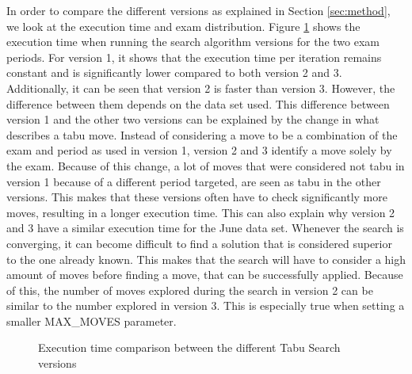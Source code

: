 In order to compare the different versions as explained in Section \ref{sec:method}, we look at the execution time and exam distribution.  Figure \ref{fig:version_comparison} shows the execution time when running the search algorithm versions for the two exam periods. For version 1, it shows that the execution time per iteration remains constant and is significantly lower compared to both version 2 and 3. Additionally, it can be seen that version 2 is faster than version 3. However, the difference between them depends on the data set used. This difference between version 1 and the other two versions can be explained by the change in what describes a tabu move. Instead of considering a move to be a combination of the exam and period as used in version 1, version 2 and 3 identify a move solely by the exam. Because of this change, a lot of moves that were considered not tabu in version 1 because of a different period targeted, are seen as tabu in the other versions. This makes that these versions often have to check significantly more moves, resulting in a longer execution time. This can also explain why version 2 and 3 have a similar execution time for the June data set. Whenever the search is converging, it can become difficult to find a solution that is considered superior to the one already known. This makes that the search will have to consider a high amount of moves before finding a move, that can be successfully applied. Because of this, the number of moves explored during the search in version 2 can be similar to the number explored in version 3. This is especially true when setting a smaller MAX\_MOVES parameter. 

\begin{figure}[H]
  \centering
  \hfill
  \caption{Execution time comparison between the different Tabu Search versions}
  \label{fig:version_comparison}
\end{figure}


